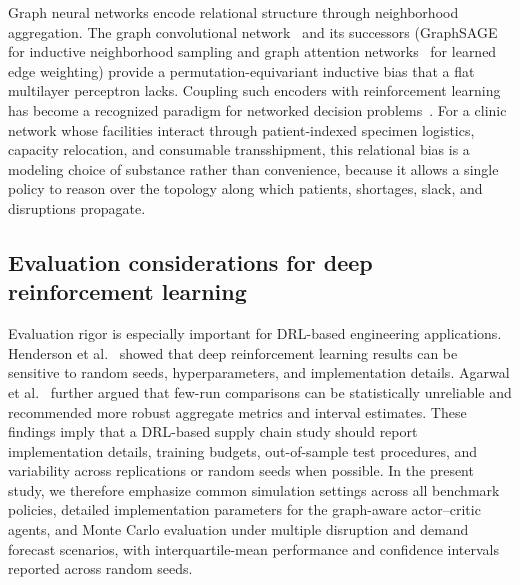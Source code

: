\documentclass[preprint,review,12pt]{elsarticle}
\begin{document}
Graph neural networks encode relational structure through neighborhood aggregation. The graph convolutional network~\cite{Kipf2017GCN} and its successors (GraphSAGE~\cite{Hamilton2017GraphSAGE} for inductive neighborhood sampling and graph attention networks~\cite{Velickovic2018GAT} for learned edge weighting) provide a permutation-equivariant inductive bias that a flat multilayer perceptron lacks. Coupling such encoders with reinforcement learning has become a recognized paradigm for networked decision problems~\cite{Liu2024GNNMARLSurvey}. For a clinic network whose facilities interact through patient-indexed specimen logistics, capacity relocation, and consumable transshipment, this relational bias is a modeling choice of substance rather than convenience, because it allows a single policy to reason over the topology along which patients, shortages, slack, and disruptions propagate.

\subsection{Evaluation considerations for deep reinforcement learning}
Evaluation rigor is especially important for DRL-based engineering applications. Henderson et al.~\cite{Henderson2018DRLMatters} showed that deep reinforcement learning results can be sensitive to random seeds, hyperparameters, and implementation details. Agarwal et al.~\cite{Agarwal2021RLiable} further argued that few-run comparisons can be statistically unreliable and recommended more robust aggregate metrics and interval estimates. These findings imply that a DRL-based supply chain study should report implementation details, training budgets, out-of-sample test procedures, and variability across replications or random seeds when possible. In the present study, we therefore emphasize common simulation settings across all benchmark policies, detailed implementation parameters for the graph-aware actor--critic agents, and Monte Carlo evaluation under multiple disruption and demand forecast scenarios, with interquartile-mean performance and confidence intervals reported across random seeds.
\end{document}

